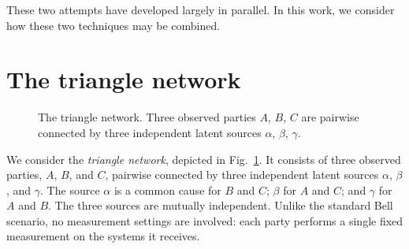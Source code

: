 \documentclass[reprint,pra, twocolumn, amsmath,amssymb,
 aps,superscriptaddress,]{revtex4-2}
\begin{document}
These two attempts have developed largely in parallel. In this work, we consider how these two techniques may be combined.

\section{The triangle network}

\begin{figure}[t]
    \centering
    \caption{The triangle network. Three observed parties $A$, $B$, $C$ are pairwise connected by three independent latent sources $\alpha$, $\beta$, $\gamma$.}
    \label{fig:triangle}
\end{figure}

We consider the \emph{triangle network}, depicted in Fig.~\ref{fig:triangle}.
It consists of three observed parties, $A$, $B$, and $C$, pairwise connected by three independent latent sources $\alpha$, $\beta$, and $\gamma$.
The source $\alpha$ is a common cause for $B$ and $C$; $\beta$ for $A$ and $C$; and $\gamma$ for $A$ and $B$.
The three sources are mutually independent.
Unlike the standard Bell scenario, no measurement settings are involved: each party performs a single fixed measurement on the systems it receives.
\end{document}
